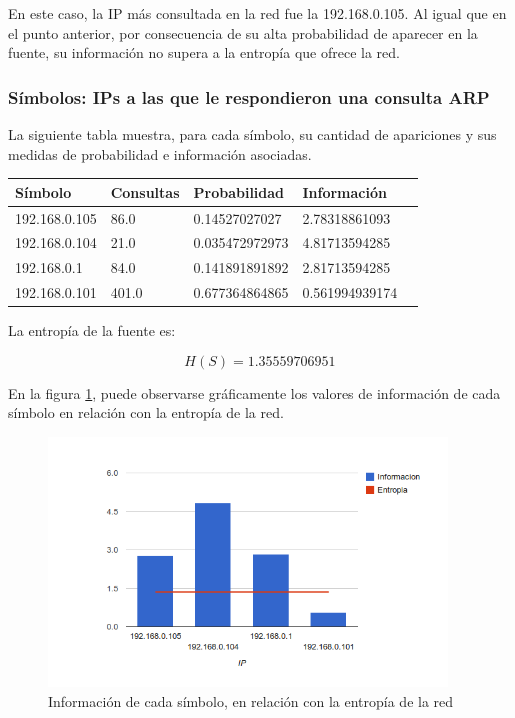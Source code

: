 \documentclass{article}
\begin{document}
En este caso, la IP más consultada en la red fue la 192.168.0.105. Al igual
que en el punto anterior, por consecuencia de su alta probabilidad de aparecer
en la fuente, su información no supera a la entropía que ofrece la red.
\newpage

\subsubsection{Símbolos: IPs a las que le respondieron una consulta ARP}
La siguiente tabla muestra, para cada símbolo, su cantidad de apariciones y
sus medidas de probabilidad e información asociadas.

\vskip10pt

\begin{tabular}{|l|l|l|l|l|}
  \hline
  Símbolo & Consultas & Probabilidad & Información \\
  \hline
  192.168.0.105 & 86.0 & 0.14527027027 & 2.78318861093\\
  \hline
  192.168.0.104 & 21.0 & 0.035472972973 & 4.81713594285\\
  \hline
  192.168.0.1 & 84.0 & 0.141891891892 & 2.81713594285\\
  \hline
  192.168.0.101 & 401.0 & 0.677364864865 & 0.561994939174\\
  \hline

\end{tabular}

\vskip10pt

La entropía de la fuente es:

$$H(S) = 1.35559706951$$

En la figura \ref{fig:red1replied:infoentro}, puede observarse gráficamente
los valores de información de cada símbolo en relación con la entropía de la
red.

\begin{figure}[h!]
    \centering                                                       
    \includegraphics[width=300pt]{respondidas1.png}
    \caption{Información de cada símbolo, en relación con la
        entropía de la red}
    \label{fig:red1replied:infoentro}
\end{figure}
\end{document}
